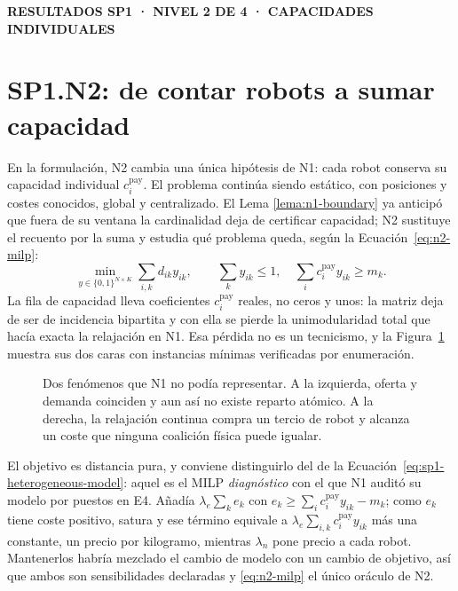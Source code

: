 \documentclass[12pt,a4paper]{article}
\renewcommand{\viuownsource}{%
  \par\vspace{0.8mm}\noindent
  \makebox[\linewidth][c]{\footnotesize\itshape Elaboración propia.}%
  \par
}
\newcommand{\leveltag}[1]{%
  \noindent\colorbox{VIUDark}{%
    \parbox{\dimexpr\textwidth-2\fboxsep\relax}{%
      \color{white}\sffamily\bfseries\small #1%
    }%
  }\par\smallskip
}
\begin{document}
\clearpage

\leveltag{RESULTADOS SP1 · NIVEL 2 DE 4 · CAPACIDADES INDIVIDUALES}
\section*{SP1.N2: de contar robots a sumar capacidad}

En la formulación, N2 cambia una única hipótesis de N1: cada robot conserva su
capacidad individual $c_i^{\mathrm{pay}}$. El problema continúa siendo
estático, con posiciones y costes conocidos, global y centralizado. El Lema
\ref{lema:n1-boundary} ya anticipó que fuera de su ventana la cardinalidad deja
de certificar capacidad; N2 sustituye el recuento por la suma y estudia qué
problema queda, según la Ecuación~\eqref{eq:n2-milp}:
\begin{equation}
\label{eq:n2-milp}
 \min_{y\in\{0,1\}^{N\times K}}\sum_{i,k}d_{ik}y_{ik},\qquad
 \sum_{k}y_{ik}\leq1,\quad \sum_{i}c_i^{\mathrm{pay}}y_{ik}\geq m_k .
\end{equation}
La fila de capacidad lleva coeficientes $c_i^{\mathrm{pay}}$ reales, no ceros y
unos: la matriz deja de ser de incidencia bipartita y con ella se pierde la
unimodularidad total que hacía exacta la relajación en N1. Esa pérdida no es un
tecnicismo, y la Figura~\ref{fig:n2-model-boundary} muestra sus dos caras con
instancias mínimas verificadas por enumeración.

\begin{figure}[H]
\centering
\begingroup
{}
\scalebox{0.94}{}
\endgroup
\caption{Dos fenómenos que N1 no podía representar. A la izquierda, oferta y
demanda coinciden y aun así no existe reparto atómico. A la derecha, la
relajación continua compra un tercio de robot y alcanza un coste que ninguna
coalición física puede igualar.}
\label{fig:n2-model-boundary}
\viuownsource
\end{figure}

El objetivo es distancia pura, y conviene distinguirlo del de la
Ecuación~\eqref{eq:sp1-heterogeneous-model}: aquel es el MILP
\emph{diagnóstico} con el que N1 auditó su modelo por puestos en E4. Añadía
$\lambda_e\sum_ke_k$ con $e_k\geq\sum_ic_i^{\mathrm{pay}}y_{ik}-m_k$; como
$e_k$ tiene coste positivo, satura y ese término equivale a
$\lambda_e\sum_{i,k}c_i^{\mathrm{pay}}y_{ik}$ más una constante, un precio por
kilogramo, mientras $\lambda_n$ pone precio a cada robot. Mantenerlos habría
mezclado el cambio de modelo con un cambio de objetivo, así que ambos son
sensibilidades declaradas y \eqref{eq:n2-milp} el único oráculo de N2.
\end{document}

